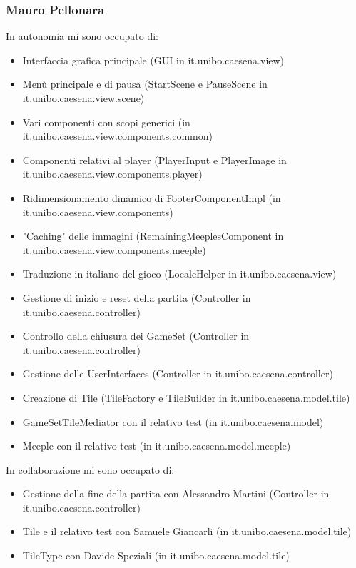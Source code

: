 \subsubsection*{Mauro Pellonara}
In autonomia mi sono occupato di:
\begin{itemize}
    \item Interfaccia grafica principale (GUI in it.unibo.caesena.view)
    \item Menù principale e di pausa (StartScene e PauseScene in it.unibo.caesena.view.scene)
    \item Vari componenti con scopi generici (in it.unibo.caesena.view.components.common)
    \item Componenti relativi al player (PlayerInput e PlayerImage in it.unibo.caesena.view.components.player)
    \item Ridimensionamento dinamico di FooterComponentImpl (in it.unibo.caesena.view.components)
    \item "Caching" delle immagini (RemainingMeeplesComponent in it.unibo.caesena.view.components.meeple)
    \item Traduzione in italiano del gioco (LocaleHelper in it.unibo.caesena.view)
    \item Gestione di inizio e reset della partita (Controller in it.unibo.caesena.controller)
    \item Controllo della chiusura dei GameSet (Controller in it.unibo.caesena.controller)
    \item Gestione delle UserInterfaces (Controller in it.unibo.caesena.controller)
    \item Creazione di Tile (TileFactory e TileBuilder in it.unibo.caesena.model.tile)
    \item GameSetTileMediator con il relativo test (in it.unibo.caesena.model)
    \item Meeple con il relativo test (in it.unibo.caesena.model.meeple)
\end{itemize}
In collaborazione mi sono occupato di:
\begin{itemize}
    \item Gestione della fine della partita con Alessandro Martini (Controller in it.unibo.caesena.controller)
    \item Tile e il relativo test con Samuele Giancarli (in it.unibo.caesena.model.tile)
    \item TileType con Davide Speziali (in it.unibo.caesena.model.tile)
\end{itemize}

